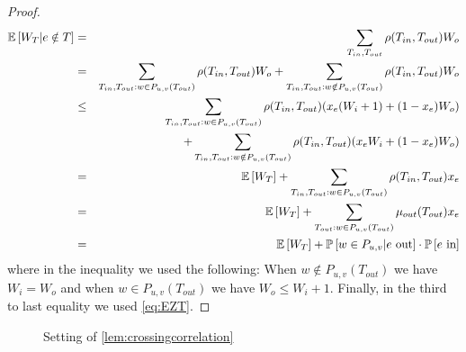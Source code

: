 \begin{proof}
\begin{eqnarray*}
{\mathbb{E}}\left[W_T | e\notin T\right] &=& \sum_{T_{in},T_{out}} \rho(T_{in},T_{out}) W_o	\\
&=& \sum_{T_{in},T_{out}: w\in P_{u,v}(T_{out})} \rho(T_{in},T_{out}) W_o + \sum_{T_{in},T_{out}: w\notin P_{u,v}(T_{out})} \rho(T_{in},T_{out}) W_o\\
&\leq& \sum_{T_{in},T_{out}: w\in P_{u,v}(T_{out})} \rho(T_{in},T_{out}) (x_e(W_i+1)+ (1-x_e) W_o)  \\
&&\quad\quad\quad +\sum_{T_{in},T_{out}: w\notin P_{u,v}(T_{out})} \rho(T_{in},T_{out})(x_e W_i+(1-x_e)W_o)\\
&=& {\mathbb{E}}\left[W_T\right] + \sum_{T_{in},T_{out}: w\in P_{u,v}(T_{out})}\rho(T_{in},T_{out}) x_e\\
&=& {\mathbb{E}}\left[W_T\right] + \sum_{T_{out}: w\in P_{u,v}(T_{out})} \mu_{out}(T_{out}) x_e\\
&=& {\mathbb{E}}\left[W_T\right] + {\mathbb{P}}\left[w\in P_{u,v} | e\text{ out}\right] \cdot {\mathbb{P}}\left[e\text{ in}\right]
\end{eqnarray*}
where in the inequality we used the following: When $w\notin P_{u,v}(T_{out})$ we have $W_i=W_o$ and when $w\in P_{u,v}(T_{out})$ we have $W_o\leq W_i+1$. Finally, in the third to last equality we used \eqref{eq:EZT}.
\end{proof}

\begin{figure}[htb]\centering
{}
\caption{Setting of \cref{lem:crossingcorrelation}} 
\label{fig:crossingcorrelation}
\end{figure}


